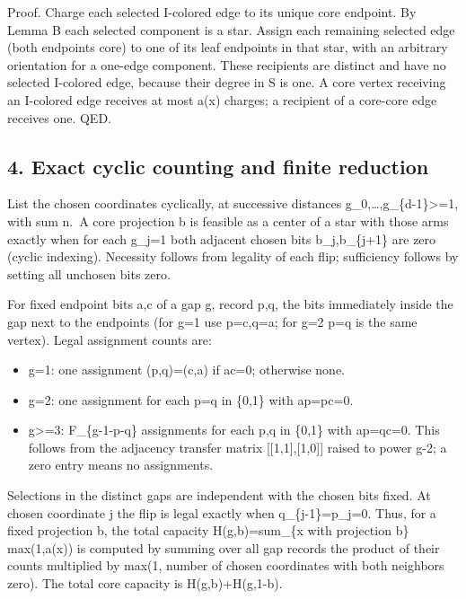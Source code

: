 \documentclass[
  10pt,
]{article}
\providecommand{\tightlist}{%
  \setlength{\itemsep}{0pt}\setlength{\parskip}{0pt}}
\begin{document}
Proof. Charge each selected I-colored edge to its unique core endpoint.
By Lemma B each selected component is a star. Assign each remaining
selected edge (both endpoints core) to one of its leaf endpoints in that
star, with an arbitrary orientation for a one-edge component. These
recipients are distinct and have no selected I-colored edge, because
their degree in S is one. A core vertex receiving an I-colored edge
receives at most a(x) charges; a recipient of a core-core edge receives
one. QED.

\subsection{4. Exact cyclic counting and finite
reduction}\label{exact-cyclic-counting-and-finite-reduction}

List the chosen coordinates cyclically, at successive distances
g\_0,\ldots,g\_\{d-1\}\textgreater=1, with sum n.~A core projection b is
feasible as a center of a star with those arms exactly when for each
g\_j=1 both adjacent chosen bits b\_j,b\_\{j+1\} are zero (cyclic
indexing). Necessity follows from legality of each flip; sufficiency
follows by setting all unchosen bits zero.

For fixed endpoint bits a,c of a gap g, record p,q, the bits immediately
inside the gap next to the endpoints (for g=1 use p=c,q=a; for g=2 p=q
is the same vertex). Legal assignment counts are:

\begin{itemize}
\tightlist
\item
  g=1: one assignment (p,q)=(c,a) if ac=0; otherwise none.
\item
  g=2: one assignment for each p=q in \{0,1\} with ap=pc=0.
\item
  g\textgreater=3: F\_\{g-1-p-q\} assignments for each p,q in \{0,1\}
  with ap=qc=0. This follows from the adjacency transfer matrix
  {[}{[}1,1{]},{[}1,0{]}{]} raised to power g-2; a zero entry means no
  assignments.
\end{itemize}

Selections in the distinct gaps are independent with the chosen bits
fixed. At chosen coordinate j the flip is legal exactly when
q\_\{j-1\}=p\_j=0. Thus, for a fixed projection b, the total capacity
H(g,b)=sum\_\{x with projection b\} max(1,a(x)) is computed by summing
over all gap records the product of their counts multiplied by max(1,
number of chosen coordinates with both neighbors zero). The total core
capacity is H(g,b)+H(g,1-b).
\end{document}

